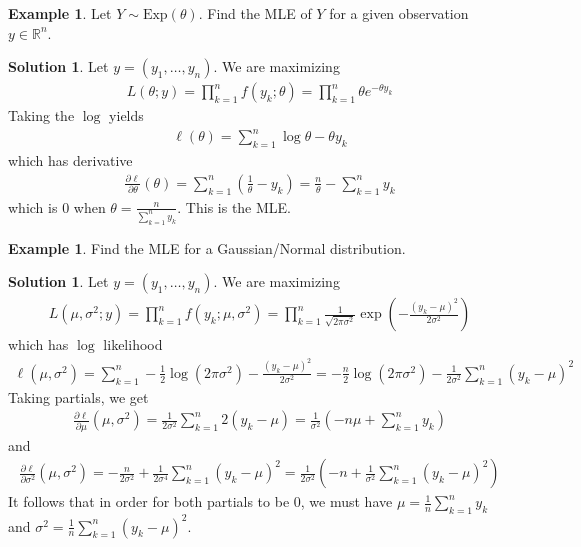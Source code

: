 \documentclass[11pt]{amsart}
\theoremstyle{definition}
\newtheorem{example}[theorem]{Example}
\newtheorem{solution}[theorem]{Solution}
\numberwithin{equation}{section}
\begin{document}
\begin{example}
    Let $Y\sim\mathrm{Exp}(\theta)$. Find the MLE of $Y$ for a given observation $y\in\mathbb R^n$.
\end{example}
\addtocounter{theorem}{-1}
\begin{solution}
    Let $y=(y_1,\ldots,y_n)$. We are maximizing
    \begin{align*}
        L(\theta;y)=\prod_{k=1}^n f(y_k;\theta)=\prod_{k=1}^n\theta e^{-\theta y_k}
    \end{align*}
    Taking the $\log$ yields
    \begin{align*}
        \ell(\theta)=\sum_{k=1}^n\log\theta-\theta y_k
    \end{align*}
    which has derivative
    \begin{align*}
        \frac{\partial\ell}{\partial\theta}(\theta)=\sum_{k=1}^n(\frac{1}{\theta}-y_k)=\frac{n}{\theta}-\sum_{k=1}^ny_k
    \end{align*}
    which is $0$ when $\theta=\frac{n}{\sum_{k=1}^ny_k}$. This is the MLE.
\end{solution}
\begin{example}
    Find the MLE for a Gaussian/Normal distribution.
\end{example}
\addtocounter{theorem}{-1}
\begin{solution}
    Let $y=(y_1,\ldots,y_n)$. We are maximizing
    \begin{align*}
        L(\mu,\sigma^2;y)=\prod_{k=1}^nf(y_k;\mu,\sigma^2)=\prod_{k=1}^n\frac{1}{\sqrt{2\pi\sigma^2}}\exp\left(-\frac{(y_k-\mu)^2}{2\sigma^2}\right)
    \end{align*}
    which has $\log$ likelihood
    \begin{align*}
        \ell(\mu,\sigma^2)=\sum_{k=1}^n-\frac{1}{2}\log(2\pi\sigma^2)-\frac{(y_k-\mu)^2}{2\sigma^2}=-\frac{n}{2}\log(2\pi\sigma^2)-\frac{1}{2\sigma^2}\sum_{k=1}^n(y_k-\mu)^2
    \end{align*}
    Taking partials, we get
    \begin{align*}
        \frac{\partial \ell}{\partial \mu}(\mu,\sigma^2)=\frac{1}{2\sigma^2}\sum_{k=1}^n2(y_k-\mu)=\frac{1}{\sigma^2}(-n\mu+\sum_{k=1}^ny_k)
    \end{align*}
    and
    \begin{align*}
        \frac{\partial\ell}{\partial\sigma^2}(\mu,\sigma^2)=-\frac{n}{2\sigma^2}+\frac{1}{2\sigma^4}\sum_{k=1}^n(y_k-\mu)^2=\frac{1}{2\sigma^2}(-n+\frac{1}{\sigma^2}\sum_{k=1}^n(y_k-\mu)^2)
    \end{align*}
    It follows that in order for both partials to be $0$, we must have $\mu=\frac{1}{n}\sum_{k=1}^ny_k$ and $\sigma^2=\frac{1}{n}\sum_{k=1}^n(y_k-\mu)^2$.
\end{solution}
\end{document}
